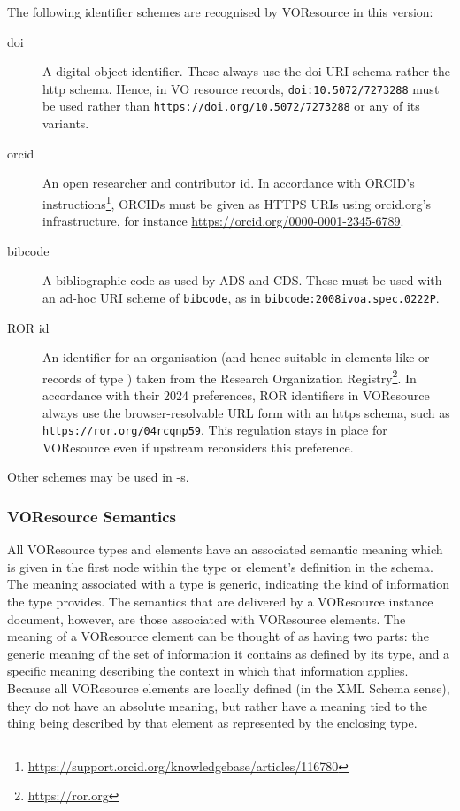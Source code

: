 \documentclass[11pt,a4paper]{ivoa}
\begin{document}
The following identifier schemes are recognised by VOResource in this
version:

\begin{description}
\item[doi] A digital object identifier.  These always use the doi URI
schema rather the http schema.  Hence, in VO resource records,
\verb|doi:10.5072/7273288| must be used rather than
\nolinkurl{https://doi.org/10.5072/7273288} or any of its variants.

\item[orcid] An open researcher and contributor id. In
accordance with ORCID's
instructions\footnote{\url{https://support.orcid.org/knowledgebase/articles/116780}}, ORCIDs must be given
as HTTPS URIs using orcid.org's infrastructure, for instance
\url{https://orcid.org/0000-0001-2345-6789}.

\item[bibcode] A bibliographic code as used by ADS and CDS.  These
must be used with an ad-hoc URI scheme of \verb|bibcode|, as in
\verb|bibcode:2008ivoa.spec.0222P|.

\item[ROR id] An identifier for an organisation (and hence suitable in
elements like  or records of type
) taken from the Research Organization
Registry\footnote{\url{https://ror.org}}.  In accordance with their 2024
preferences, ROR identifiers in VOResource always use the
browser-resolvable URL form with an https schema, such as
\nolinkurl{https://ror.org/04rcqnp59}.  This regulation stays in place
for VOResource even if upstream reconsiders this preference.
\end{description}

Other schemes may be used in -s.

\subsubsection{VOResource Semantics}

All VOResource types and elements have an associated semantic meaning
which is given in the first 
node within the type or element's definition in the schema.  The
meaning associated with a type is generic, indicating the kind of
information the type provides.  The semantics that are delivered by a
VOResource instance document, however, are those associated with
VOResource elements.  The meaning of a VOResource element can be
thought of as having two parts:  the generic meaning of the set of
information it contains as defined by its type, and a specific meaning
describing the context in which that information applies.  Because all
VOResource elements are locally defined (in the XML Schema
sense), they do not have an absolute meaning, but rather have a
meaning tied to the thing being described by that element as
represented by the enclosing type.
\end{document}
